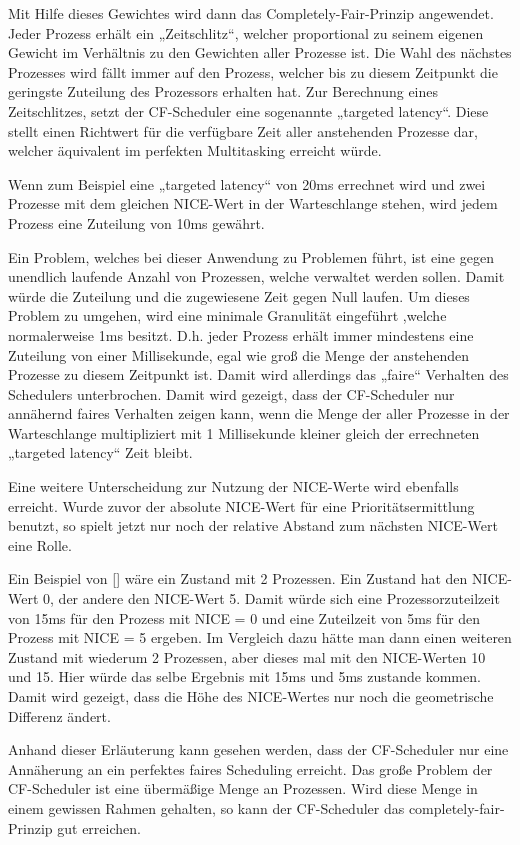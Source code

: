 Mit Hilfe dieses Gewichtes wird dann das Completely-Fair-Prinzip angewendet. Jeder Prozess erhält ein „Zeitschlitz“, welcher proportional zu seinem eigenen Gewicht im Verhältnis zu den Gewichten aller Prozesse ist. Die Wahl des nächstes Prozesses wird fällt immer auf den Prozess, welcher bis zu diesem Zeitpunkt die geringste Zuteilung des Prozessors erhalten hat.
Zur Berechnung eines Zeitschlitzes, setzt der CF-Scheduler eine sogenannte „targeted latency“. Diese stellt einen Richtwert für die verfügbare Zeit aller anstehenden Prozesse dar, welcher äquivalent im perfekten Multitasking erreicht würde.

Wenn zum Beispiel eine „targeted latency“ von 20ms errechnet wird und zwei Prozesse mit dem gleichen NICE-Wert in der Warteschlange stehen, wird jedem Prozess eine Zuteilung von 10ms gewährt.

Ein Problem, welches bei dieser Anwendung zu Problemen führt, ist eine gegen unendlich laufende Anzahl von Prozessen, welche verwaltet werden sollen. Damit würde die Zuteilung und die zugewiesene Zeit gegen Null laufen. Um dieses Problem zu umgehen, wird eine minimale Granulität eingeführt ,welche normalerweise 1ms besitzt. D.h. jeder Prozess erhält immer mindestens eine Zuteilung von einer Millisekunde, egal wie groß die Menge der anstehenden Prozesse zu diesem Zeitpunkt ist. Damit wird allerdings das „faire“ Verhalten des Schedulers unterbrochen. Damit wird gezeigt, dass der CF-Scheduler nur annähernd faires Verhalten zeigen kann, wenn die Menge der aller Prozesse in der Warteschlange multipliziert mit 1 Millisekunde kleiner gleich der errechneten „targeted latency“ Zeit bleibt.

Eine weitere Unterscheidung zur Nutzung der NICE-Werte wird ebenfalls erreicht. Wurde zuvor der absolute NICE-Wert für eine Prioritätsermittlung benutzt, so spielt jetzt nur noch der relative Abstand zum nächsten NICE-Wert eine Rolle.

Ein Beispiel von [\cite{vorschlag}] wäre ein Zustand mit 2 Prozessen. Ein Zustand hat den NICE-Wert 0, der andere den NICE-Wert 5. Damit würde sich eine Prozessorzuteilzeit von 15ms für den Prozess mit NICE = 0 und eine Zuteilzeit von 5ms für den Prozess mit NICE = 5 ergeben.
Im Vergleich dazu hätte man dann einen weiteren Zustand mit wiederum 2 Prozessen, aber dieses mal mit den NICE-Werten 10 und 15. Hier würde das selbe Ergebnis mit 15ms und 5ms zustande kommen. Damit wird gezeigt, dass die Höhe des NICE-Wertes nur noch die geometrische Differenz ändert.

Anhand dieser Erläuterung kann gesehen werden, dass der CF-Scheduler nur eine Annäherung an ein perfektes faires Scheduling erreicht. Das große Problem der CF-Scheduler ist eine übermäßige Menge an Prozessen. Wird diese Menge in einem gewissen Rahmen gehalten, so kann der CF-Scheduler das \glqq completely-fair\grqq -Prinzip gut erreichen. 
